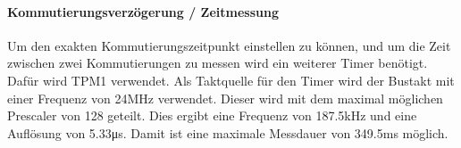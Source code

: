 \paragraph{Kommutierungsverzögerung / Zeitmessung}$~~$\vspace{2mm}\\
\fi
Um den exakten Kommutierungszeitpunkt einstellen zu können, und um die Zeit 
zwischen zwei Kommutierungen zu messen wird ein weiterer Timer benötigt. Dafür 
wird TPM1 verwendet. Als Taktquelle für den Timer wird der Bustakt mit einer 
Frequenz von 24\si{\mega\hertz} verwendet. Dieser wird mit dem maximal möglichen 
Prescaler von 128 geteilt. Dies ergibt eine Frequenz von 187.5\si{\kilo\hertz} 
und eine Auflösung von 5.33\si{\micro\second}. Damit ist eine maximale 
Messdauer von 349.5\si{\milli\second} möglich. 
